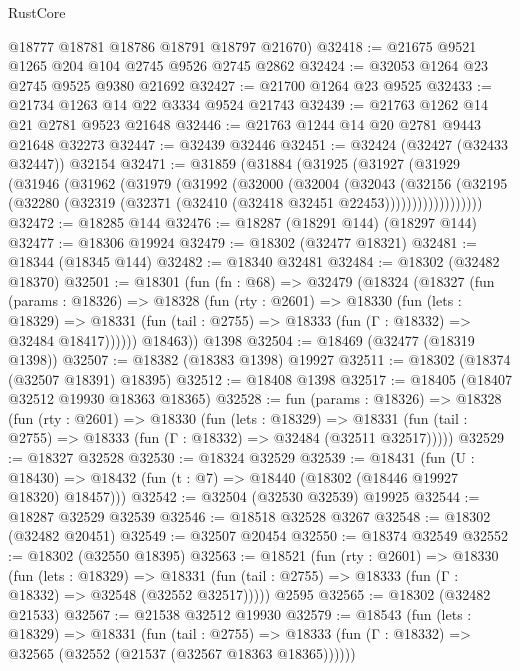 \begin{lexlean}{RustCore}
\begin{coremodule}
      @18777
      @18781
      @18786
      @18791
      @18797
      @21670)
@32418 := @21675 @9521 @1265 @204 @104 @2745 @9526 @2745 @2862
@32424 := @32053 @1264 @23 @2745 @9525 @9380 @21692
@32427 := @21700 @1264 @23 @9525
@32433 := @21734 @1263 @14 @22 @3334 @9524 @21743
@32439 := @21763 @1262 @14 @21 @2781 @9523 @21648
@32446 := @21763 @1244 @14 @20 @2781 @9443 @21648 @32273
@32447 := @32439 @32446
@32451 := @32424 (@32427 (@32433 @32447)) @32154
@32471 := @31859
    (@31884
      (@31925
        (@31927
          (@31929
            (@31946
              (@31962
                (@31979
                  (@31992
                    (@32000
                      (@32004
                        (@32043
                          (@32156
                            (@32195
                              (@32280
                                (@32319 (@32371 (@32410 (@32418 @32451 @22453))))))))))))))))))
@32472 := @18285 @144
@32476 := @18287 (@18291 @144) (@18297 @144)
@32477 := @18306 @19924
@32479 := @18302 (@32477 @18321)
@32481 := @18344 (@18345 @144)
@32482 := @18340 @32481
@32484 := @18302 (@32482 @18370)
@32501 := @18301
    (fun (fn : @68) =>
    @32479
      (@18324
        (@18327
          (fun (params : @18326) =>
          @18328
            (fun (rty : @2601) =>
            @18330
              (fun (lets : @18329) =>
              @18331 (fun (tail : @2755) => @18333 (fun (Γ : @18332) => @32484 @18417))))))
        @18463))
    @1398
@32504 := @18469 (@32477 (@18319 @1398))
@32507 := @18382 (@18383 @1398) @19927
@32511 := @18302 (@18374 (@32507 @18391) @18395)
@32512 := @18408 @1398
@32517 := @18405 (@18407 @32512 @19930 @18363 @18365)
@32528 := fun (params : @18326) =>
  @18328
    (fun (rty : @2601) =>
    @18330
      (fun (lets : @18329) =>
      @18331 (fun (tail : @2755) => @18333 (fun (Γ : @18332) => @32484 (@32511 @32517)))))
@32529 := @18327 @32528
@32530 := @18324 @32529
@32539 := @18431
    (fun (U : @18430) => @18432 (fun (t : @7) => @18440 (@18302 (@18446 @19927 @18320) @18457)))
@32542 := @32504 (@32530 @32539) @19925
@32544 := @18287 @32529 @32539
@32546 := @18518 @32528 @3267
@32548 := @18302 (@32482 @20451)
@32549 := @32507 @20454
@32550 := @18374 @32549
@32552 := @18302 (@32550 @18395)
@32563 := @18521
    (fun (rty : @2601) =>
    @18330
      (fun (lets : @18329) =>
      @18331 (fun (tail : @2755) => @18333 (fun (Γ : @18332) => @32548 (@32552 @32517)))))
    @2595
@32565 := @18302 (@32482 @21533)
@32567 := @21538 @32512 @19930
@32579 := @18543
    (fun (lets : @18329) =>
    @18331
      (fun (tail : @2755) =>
      @18333 (fun (Γ : @18332) => @32565 (@32552 (@21537 (@32567 @18363 @18365))))))

\end{coremodule}
\end{lexlean}
